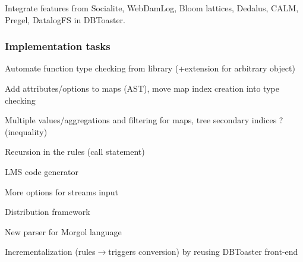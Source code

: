 \documentclass[11pt]{article}
\begin{document}
Integrate features from Socialite\cite{socialite}, WebDamLog\cite{webdamlog}, Bloom lattices\cite{bloom_lattices}, Dedalus\cite{dedalus}, CALM\cite{bloom_calm}, Pregel\cite{pregel}, DatalogFS\cite{datalog_fs} in DBToaster\cite{dbtoaster09,dbtoaster11}.

\subsubsection*{Implementation tasks}\ol
\item Automate function type checking from library (+extension for arbitrary object)
\item Add attributes/options to maps (AST), move map index creation into type checking
\item Multiple values/aggregations and filtering for maps, tree secondary indices ? (inequality)
\item Recursion in the rules (call statement)
\item LMS code generator
\item More options for streams input
\item Distribution framework
\item New parser for Morgol language
\item Incrementalization (rules$\to$triggers conversion) by reusing DBToaster front-end
\ole

\newpage
\def\pdfurl#1{\href{#1}{\footnotesize pdf}}
{\small }
\end{document}
